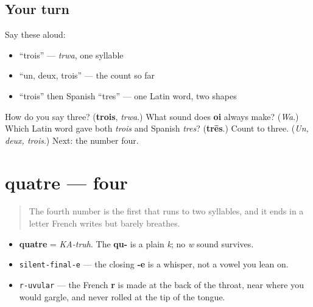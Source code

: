 \subsection*{Your turn}
Say these aloud:

\begin{itemize}
\raggedright
  \item \textquotedblleft{}trois\textquotedblright{} — \emph{trwa}, one syllable
  \item \textquotedblleft{}un, deux, trois\textquotedblright{} — the count so far
  \item \textquotedblleft{}trois\textquotedblright{} then Spanish \textquotedblleft{}tres\textquotedblright{} — one Latin word, two shapes
\end{itemize}

\begin{tcolorbox}[breakable,colback=teal!4,colframe=teal!35!black,title={Before you move on}]
How do you say three? (\textbf{trois}, \emph{trwa}.) What sound does \textbf{oi} always make? (\emph{Wa}.) Which Latin word gave both \emph{trois} and Spanish \emph{tres}? (\textbf{trēs}.) Count to three. (\emph{Un, deux, trois}.) Next: the number four.
\end{tcolorbox}
\section[quatre]{quatre — four}

\label{lesson:FR-C06-quatre}



\begin{quote}
The fourth number is the first that runs to two syllables, and it ends in a letter French writes but barely breathes.
\end{quote}

\begin{sounds}
\begin{itemize}
\raggedright
  \item \textbf{quatre} = \emph{KA-truh}. The \textbf{qu-} is a plain \emph{k}; no \emph{w} sound survives.
  \item \texttt{silent-final-e} — the closing \textbf{-e} is a whisper, not a vowel you lean on.
  \item \texttt{r-uvular} — the French \textbf{r} is made at the back of the throat, near where you would gargle, and never rolled at the tip of the tongue.
\end{itemize}
\end{sounds}

